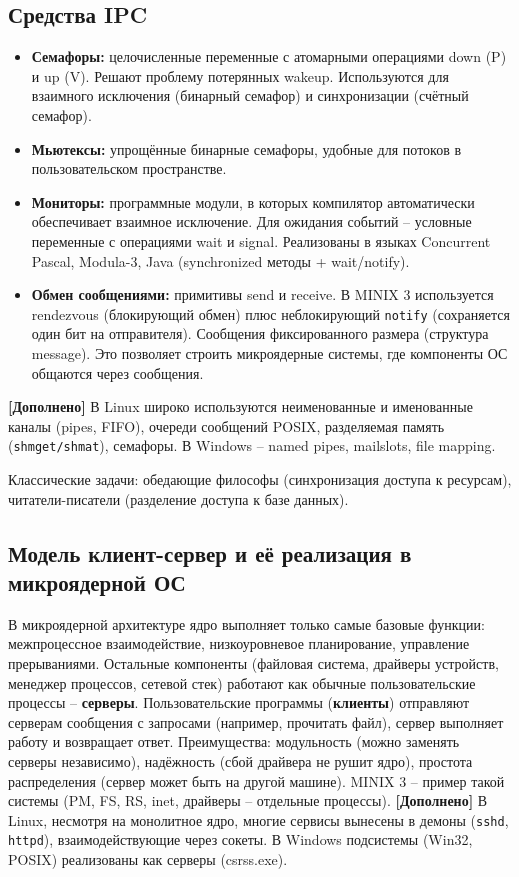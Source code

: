 \documentclass[a4paper,12pt]{article}
\begin{document}
\subsection{Средства IPC}
\begin{itemize}
    \item \textbf{Семафоры:} целочисленные переменные с атомарными операциями down (P) и up (V). Решают проблему потерянных wakeup. Используются для взаимного исключения (бинарный семафор) и синхронизации (счётный семафор).
    \item \textbf{Мьютексы:} упрощённые бинарные семафоры, удобные для потоков в пользовательском пространстве.
    \item \textbf{Мониторы:} программные модули, в которых компилятор автоматически обеспечивает взаимное исключение. Для ожидания событий – условные переменные с операциями wait и signal. Реализованы в языках Concurrent Pascal, Modula-3, Java (synchronized методы + wait/notify).
    \item \textbf{Обмен сообщениями:} примитивы send и receive. В MINIX 3 используется rendezvous (блокирующий обмен) плюс неблокирующий \texttt{notify} (сохраняется один бит на отправителя). Сообщения фиксированного размера (структура message). Это позволяет строить микроядерные системы, где компоненты ОС общаются через сообщения.
\end{itemize}
\textbf{[Дополнено]} В Linux широко используются неименованные и именованные каналы (pipes, FIFO), очереди сообщений POSIX, разделяемая память (\texttt{shmget/shmat}), семафоры. В Windows – named pipes, mailslots, file mapping.

Классические задачи: обедающие философы (синхронизация доступа к ресурсам), читатели-писатели (разделение доступа к базе данных).

\subsection{Модель клиент-сервер и её реализация в микроядерной ОС}
В микроядерной архитектуре ядро выполняет только самые базовые функции: межпроцессное взаимодействие, низкоуровневое планирование, управление прерываниями. Остальные компоненты (файловая система, драйверы устройств, менеджер процессов, сетевой стек) работают как обычные пользовательские процессы – \textbf{серверы}. Пользовательские программы (\textbf{клиенты}) отправляют серверам сообщения с запросами (например, прочитать файл), сервер выполняет работу и возвращает ответ. Преимущества: модульность (можно заменять серверы независимо), надёжность (сбой драйвера не рушит ядро), простота распределения (сервер может быть на другой машине). MINIX 3 – пример такой системы (PM, FS, RS, inet, драйверы – отдельные процессы).
\textbf{[Дополнено]} В Linux, несмотря на монолитное ядро, многие сервисы вынесены в демоны (\texttt{sshd}, \texttt{httpd}), взаимодействующие через сокеты. В Windows подсистемы (Win32, POSIX) реализованы как серверы (csrss.exe).
\end{document}
